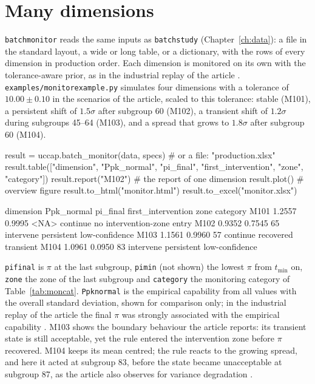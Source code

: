 \documentclass[a4paper,11pt,oneside,openany,parskip=half-,headings=standardclasses,toc=flat,numbers=noenddot]{scrbook}
\newcommand{\code}[1]{\texttt{\begingroup\def\_{\textunderscore\allowbreak}#1\endgroup}}
\newcommand{\chapref}[1]{Chapter~\ref{#1}}
\newcommand{\tabref}[1]{Table~\ref{#1}}
\begin{document}
\section{Many dimensions}\label{sec:batchmonitor}

\code{batch\_monitor} reads the same inputs as \code{batch\_study} (\chapref{ch:data}): a file in the standard
layout, a wide or long table, or a dictionary, with the rows of every dimension in production order. Each dimension
is monitored on its own with the tolerance-aware prior, as in the industrial replay of the article
\cite[Sec.~5.7]{jy-monitor}. \code{examples/monitor\_example.py} simulates four dimensions with a tolerance of
$10.00 \pm 0.10$ in the scenarios of the article, scaled to this tolerance: stable (M101), a persistent shift of
$1.5\sigma$ after subgroup 60 (M102), a transient shift of $1.2\sigma$ during subgroups 45--64 (M103), and a spread
that grows to $1.8\sigma$ after subgroup 60 (M104).

\begin{pycode}
result = uccap.batch_monitor(data, specs)     # or a file: "production.xlsx"
result.table(["dimension", "Ppk_normal", "pi_final", "first_intervention",
              "zone", "category"])
result.report("M102")                         # the report of one dimension
result.plot()                                 # overview figure
result.to_html("monitor.html")
result.to_excel("monitor.xlsx")
\end{pycode}

\begin{outbox}
dimension  Ppk_normal  pi_final  first_intervention      zone                   category
     M101      1.2557    0.9995                <NA>  continue no intervention-zone entry
     M102      0.9352    0.7545                  65 intervene  persistent low-confidence
     M103      1.1561    0.9960                  57  continue        recovered transient
     M104      1.0961    0.0950                  83 intervene  persistent low-confidence
\end{outbox}

\code{pi\_final} is $\pi$ at the last subgroup, \code{pi\_min} (not shown) the lowest $\pi$ from $t_{\min}$ on, \code{zone} the
zone of the last subgroup and \code{category} the monitoring category of \tabref{tab:moncat}. \code{Ppk\_normal}
is the empirical capability from all values with the overall standard deviation, shown for comparison only; in the
industrial replay of the article the final $\pi$ was strongly associated with the empirical capability
\cite[Sec.~5.7]{jy-monitor}. M103 shows the boundary behaviour the article reports: its transient state is still
acceptable, yet the rule entered the intervention zone before $\pi$ recovered. M104 keeps its mean centred; the rule
reacts to the growing spread, and here it acted at subgroup 83, before the state became unacceptable at subgroup 87,
as the article also observes for variance degradation \cite[Sec.~5.3]{jy-monitor}.
\end{document}
